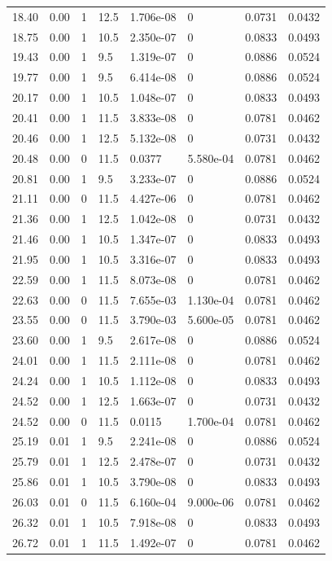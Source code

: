 \documentclass[preview]{standalone}
\begin{document}
{{{\begin{tabular}{L{1.2cm}C{1.2cm} C{0.3cm}C{0.5cm} C{1.4cm}C{1.4cm} C{1.4cm}C{1.4cm}}
  18.40  &  0.00  & 1     & 12.5 &  1.706e-08  & 0  & 0.0731 &  0.0432   \\ 
  18.75  &  0.00  & 1     & 10.5 &  2.350e-07  & 0  & 0.0833 &  0.0493   \\ 
  19.43  &  0.00  & 1     & 9.5 &  1.319e-07  & 0  & 0.0886 &  0.0524   \\ 
  19.77  &  0.00  & 1     & 9.5 &  6.414e-08  & 0  & 0.0886 &  0.0524   \\ 
  20.17  &  0.00  & 1     & 10.5 &  1.048e-07  & 0  & 0.0833 &  0.0493   \\ 
  20.41  &  0.00  & 1     & 11.5 &  3.833e-08  & 0  & 0.0781 &  0.0462   \\ 
  20.46  &  0.00  & 1     & 12.5 &  5.132e-08  & 0  & 0.0731 &  0.0432   \\ 
  20.48  &  0.00  & 0     & 11.5 &  0.0377  & 5.580e-04  & 0.0781 &  0.0462   \\ 
  20.81  &  0.00  & 1     & 9.5 &  3.233e-07  & 0  & 0.0886 &  0.0524   \\ 
  21.11  &  0.00  & 0     & 11.5 &  4.427e-06  & 0  & 0.0781 &  0.0462   \\ 
  21.36  &  0.00  & 1     & 12.5 &  1.042e-08  & 0  & 0.0731 &  0.0432   \\ 
  21.46  &  0.00  & 1     & 10.5 &  1.347e-07  & 0  & 0.0833 &  0.0493   \\ 
  21.95  &  0.00  & 1     & 10.5 &  3.316e-07  & 0  & 0.0833 &  0.0493   \\ 
  22.59  &  0.00  & 1     & 11.5 &  8.073e-08  & 0  & 0.0781 &  0.0462   \\ 
  22.63  &  0.00  & 0     & 11.5 &  7.655e-03  & 1.130e-04  & 0.0781 &  0.0462   \\ 
  23.55  &  0.00  & 0     & 11.5 &  3.790e-03  & 5.600e-05  & 0.0781 &  0.0462   \\ 
  23.60  &  0.00  & 1     & 9.5 &  2.617e-08  & 0  & 0.0886 &  0.0524   \\ 
  24.01  &  0.00  & 1     & 11.5 &  2.111e-08  & 0  & 0.0781 &  0.0462   \\ 
  24.24  &  0.00  & 1     & 10.5 &  1.112e-08  & 0  & 0.0833 &  0.0493   \\ 
  24.52  &  0.00  & 1     & 12.5 &  1.663e-07  & 0  & 0.0731 &  0.0432   \\ 
  24.52  &  0.00  & 0     & 11.5 &  0.0115  & 1.700e-04  & 0.0781 &  0.0462   \\ 
  25.19  &  0.01  & 1     & 9.5 &  2.241e-08  & 0  & 0.0886 &  0.0524   \\ 
  25.79  &  0.01  & 1     & 12.5 &  2.478e-07  & 0  & 0.0731 &  0.0432   \\ 
  25.86  &  0.01  & 1     & 10.5 &  3.790e-08  & 0  & 0.0833 &  0.0493   \\ 
  26.03  &  0.01  & 0     & 11.5 &  6.160e-04  & 9.000e-06  & 0.0781 &  0.0462   \\ 
  26.32  &  0.01  & 1     & 10.5 &  7.918e-08  & 0  & 0.0833 &  0.0493   \\ 
  26.72  &  0.01  & 1     & 11.5 &  1.492e-07  & 0  & 0.0781 &  0.0462   \\ 
\hline 
\end{tabular} 

}}}
\end{document}
